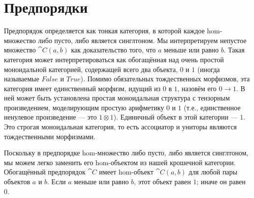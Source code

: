 \begin{figure}[H]
  \centering
  \begin{subfigure}
    \centering
  \end{subfigure}
  \hspace{1cm}
  \begin{subfigure}
    \centering
  \end{subfigure}
\end{figure}

\section{Предпорядки}

Предпорядок определяется как тонкая категория, в которой каждое hom-множество
либо пусто, либо является синглтоном. Мы интерпретируем непустое множество
$\cat{C}(a, b)$ как доказательство того, что $a$ меньше или равно
$b$. Такая категория может интерпретироваться как обогащённая над очень
простой моноидальной категорией, содержащей всего два объекта, $0$ и $1$
(иногда называемые $\mathit{False}$ и $\mathit{True}$). Помимо обязательных тождественных
морфизмов, эта категория имеет единственный морфизм, идущий из $0$ в $1$, назовём
его $0 \to 1$. В ней может быть установлена простая моноидальная структура
с тензорным произведением, моделирующим простую
арифметику $0$ и $1$ (т.е., единственное ненулевое произведение — это $1 \otimes 1$).
Единичный объект в этой категории — $1$. Это строгая моноидальная
категория, то есть ассоциатор и униторы являются тождественными
морфизмами.

Поскольку в предпорядке hom-множество либо пусто, либо является синглтоном, мы можем
легко заменить его hom-объектом из нашей крошечной категории. Обогащённый
предпорядок $\cat{C}$ имеет hom-объект $\cat{C}(a, b)$ для любой пары
объектов $a$ и $b$. Если $a$ меньше или равно
$b$, этот объект равен $1$; иначе он равен $0$.

